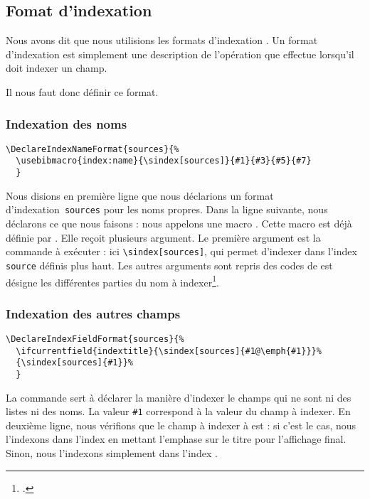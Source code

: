 \subsection{Fomat d'indexation }

Nous avons dit que nous utilisions les formats d'indexation . Un format d'indexation   est simplement une description de l'opération que  effectue lorsqu'il doit indexer un champ. 

Il nous faut donc définir ce format. 

\subsubsection{Indexation des noms}

\begin{verbatim}
\DeclareIndexNameFormat{sources}{%
  \usebibmacro{index:name}{\sindex[sources]}{#1}{#3}{#5}{#7}
  }
\end{verbatim}

Nous disions en première ligne que nous déclarions un format d'indexation \verb|sources| pour les noms propres. Dans la ligne suivante, nous déclarons ce que nous faisons : nous appelons une macro . Cette macro est déjà définie par . Elle reçoit plusieurs argument. Le première argument est la commande à exécuter : ici \verb|\sindex[sources]|, qui permet d'indexer dans l'index \verb|source| définis plus haut. Les autres arguments sont repris des codes de  est désigne les différentes parties du nom à indexer\footcite[Nous renvoyons le lecteur à la documentation de  : ][]{biblatex_formats}.


\subsubsection{Indexation des autres champs}

\begin{verbatim}
\DeclareIndexFieldFormat{sources}{%
  \ifcurrentfield{indextitle}{\sindex[sources]{#1@\emph{#1}}}%
  {\sindex[sources]{#1}}%
  }
\end{verbatim}

La commande  sert à déclarer la manière d'indexer le champs qui ne sont ni des listes ni des noms. La valeur \verb|#1| correspond à la valeur du champ à indexer. En deuxième ligne, nous vérifions que le champ à indexer à est  : si c'est le cas, nous l'indexons dans l'index  en mettant l'emphase sur le titre pour l'affichage final. Sinon, nous l'indexons simplement dans l'index .

